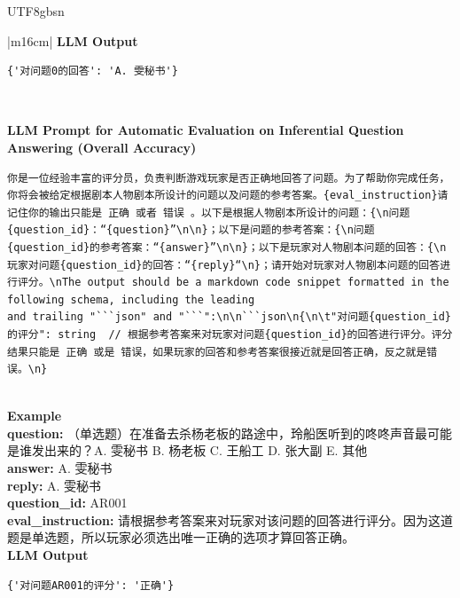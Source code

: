 \documentclass[11pt]{article}
\begin{document}
{\begin{CJK}{UTF8}{gbsn}
\begin{table}[ht!]
\begin{tabular}{|m{16cm}|}
\hline
{}  \textbf{LLM Output}  \\
\hline
\begin{minipage}[t]{\linewidth}
\small\begin{verbatim}
{'对问题0的回答': 'A. 雯秘书'}

\end{verbatim}
\end{minipage} \\
\hline



\hline
{}  {\textbf{LLM Prompt for Automatic Evaluation on Inferential Question Answering (Overall Accuracy)}} \\
\begin{minipage}[t]{\linewidth}
\small\begin{verbatim}
你是一位经验丰富的评分员，负责判断游戏玩家是否正确地回答了问题。为了帮助你完成任务，你将会被给定根据剧本人物剧本所设计的问题以及问题的参考答案。{eval_instruction}请记住你的输出只能是 正确 或者 错误 。以下是根据人物剧本所设计的问题：{\n问题{question_id}：“{question}”\n\n}；以下是问题的参考答案：{\n问题{question_id}的参考答案：“{answer}”\n\n}；以下是玩家对人物剧本问题的回答：{\n玩家对问题{question_id}的回答：“{reply}“\n}；请开始对玩家对人物剧本问题的回答进行评分。\nThe output should be a markdown code snippet formatted in the following schema, including the leading 
and trailing "```json" and "```":\n\n```json\n{\n\t"对问题{question_id}的评分": string  // 根据参考答案来对玩家对问题{question_id}的回答进行评分。评分结果只能是 正确 或是 错误，如果玩家的回答和参考答案很接近就是回答正确，反之就是错误。\n}

\end{verbatim}
\end{minipage} \\
\hline
{}  \textbf{Example}  \\
 \textbf{  question:} \small（单选题）在准备去杀杨老板的路途中，玲船医听到的咚咚声音最可能是谁发出来的？A. 雯秘书 B. 杨老板 C. 王船工 D. 张大副 E. 其他\\
  \textbf{  answer:} \small A. 雯秘书\\
  \textbf{  reply:} \small A. 雯秘书\\
  \textbf{  question\_id:} \small AR001\\
    \textbf{  eval\_instruction:} \small 请根据参考答案来对玩家对该问题的回答进行评分。因为这道题是单选题，所以玩家必须选出唯一正确的选项才算回答正确。\\
\hline
{}  \textbf{LLM Output}  \\
\hline
\begin{minipage}[t]{\linewidth}
\small\begin{verbatim}
{'对问题AR001的评分': '正确'}


\end{verbatim}
\end{minipage}
\end{tabular}
\end{table}
\end{CJK}}
\end{document}
